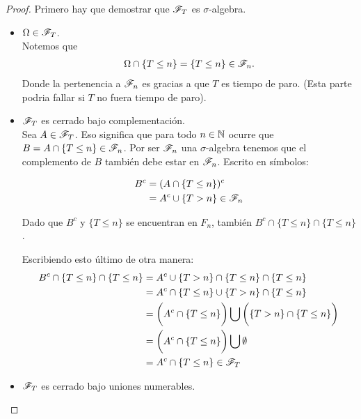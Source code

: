 \begin{proof}
		Primero hay que demostrar que ${\mathscr{F}_T}$ es ${\sigma}$-algebra.\\
		
		\begin{itemize}
			\item ${\Omega \in \mathscr{F}_T}$. \\
			
				Notemos que 
				\begin{align}
					\Omega \cap \{T \leq n\} = \{T \leq n\} \in \mathscr{F}_n.
				\end{align}
				Donde la pertenencia a ${\mathscr{F}_n}$ es gracias a que ${T}$ es tiempo de paro. (Esta parte podria fallar si ${T}$ no fuera tiempo de paro).\\
			
			\item ${\mathscr{F}_T}$ es cerrado bajo complementación.\\
			
				Sea ${A \in \mathscr{F}_T}$. Eso significa que para todo ${n \in  \mathbb{N}}$ ocurre que ${B = A \cap \{ T \leq n \} \in \mathscr{F}_n}$. Por ser ${\mathscr{F}_n}$
								una ${\sigma}$-algebra tenemos que el complemento de ${B}$ también debe estar en ${\mathscr{F}_n}$. Escrito en símbolos:
				
				\begin{align}
					B^c 	&= (A   \cap \{ T \leq n \})^c \\
							&=  A^c \cup \{ T > n \} \in \mathscr{F}_n
				\end{align}
				
				Dado que ${B^c}$ y ${\{ T \leq n \}}$ se encuentran en ${F_n}$, también ${B^c \cap \{ T \leq n \} \cap \{ T \leq n \}}$.
				
				Escribiendo esto último de otra manera:
				\begin{align}
					B^c \cap \{ T \leq n \} \cap \{ T \leq n \} 	&=		A^c \cup \{ T > n \} \cap \{ T \leq n \} \cap \{ T \leq n \} \\
																	&= 		A^c \cap \{ T \leq n \} \cup \{ T > n \} \cap \{ T \leq n \} \\
																	&= 		\bigg(A^c \cap \{ T \leq n \}\bigg) 
																				\bigcup 
																			\bigg(\{ T > n \} \cap \{ T \leq n \}\bigg) \\
																	&=		\bigg(A^c \cap \{ T \leq n \}\bigg)	\bigcup \emptyset \\
																	&=		A^c \cap \{ T \leq n \} \in \mathscr{F}_T
				\end{align}
				
				
			\item ${\mathscr{F}_T}$ es cerrado bajo uniones numerables.
		\end{itemize}
		

\end{proof}
